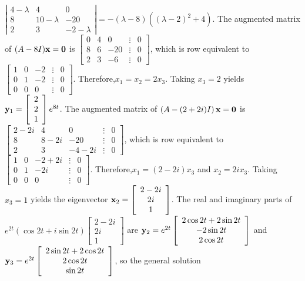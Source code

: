 \documentclass[dvips]{book}
\renewcommand{\exer}[1]{\par\medskip\;\noindent{\color{red}\bf #1.}}
\numberwithin{example}{section}
\numberwithin{equation}{section}
\numberwithin{theorem}{section}
\numberwithin{table}{section}
\numberwithin{figure}{section}
\newcommand{\threecol}[3]{\left[\begin{array}{r}#1\\#2\\#3\end{array}\right]}
\begin{document}
\exer{10.6.22}
$\left|\begin{array}{ccc}4-\lambda&4&0\\8&10-\lambda&-20\\2
&3&-2-\lambda\end{array}\right|=-(\lambda-8)\left((\lambda-2)^2+4\right)$.
 The augmented matrix of $(A-8I){\bf x=0}$ is
$\left[\begin{array}{rrrcr}0&4&0&\vdots&0\\8&6&-20&\vdots&0\\
2&3&-6&\vdots&0\end{array}\right]$,
which is row equivalent to
$\left[\begin{array}{rrrcr} 1&0&-2&\vdots&0\\ 0&1&-2&
\vdots&0\\ 0&0&0&\vdots&0\end{array}\right]$.
Therefore,$x_1=x_2=2x_3$. Taking $x_3=2$ yields
${\bf y}_1=\threecol221e^{8t}$.
The augmented matrix of
$\left(A-(2+2i)I\right){\bf x=0}$ is
$\left[\begin{array}{ccccc}2-2i&4&0&\vdots&0\\8&
8-2i&-20&\vdots&0\\2&3&-4-2i&\vdots&0\end{array}\right]$,
which is row equivalent to
$\left[\begin{array}{ccccc} 1&0&-2+2i&\vdots&0\\
0&1&-2i&\vdots&0\\ 0&0&0&\vdots&0\end{array}\right]$.
Therefore,$x_1=(2-2i)x_3$ and $x_2=2ix_3$.
Taking $x_3=1$ yields the eigenvector
${\bf x}_2=\left[\begin{array}{c}2-2i\\2i\\1\end{array}\right]$.
The real and imaginary parts of
$e^{2t}(\cos2t+i\sin
2t)\left[\begin{array}{c}2-2i\\2i\\1\end{array}\right]$
are ${\bf y}_2=e^{2t}\left[\begin{array}{c}2\cos2t+2\sin2t
\\-2\sin2t\\2\cos2t\end{array}\right]$ and
${\bf y}_3=e^{2t}\left[\begin{array}{c}2\sin2t+2\cos2t
\\2\cos2t\\\sin2t\end{array}\right]$, so the general solution
\end{document}
